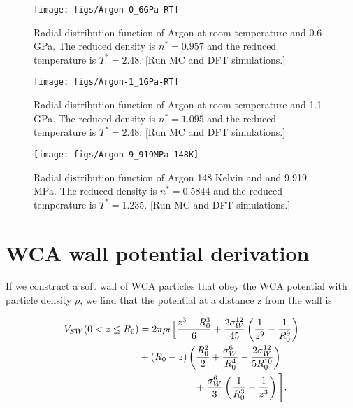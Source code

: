 \documentclass[letterpaper,twocolumn,amsmath,amssymb,prb]{revtex4-1}
\newcommand{\red}[1]{{\color{red} #1}}
\newcommand{\fixme}[1]{\red{[#1]}}
\begin{document}
\begin{figure}
\begin{center}
\texttt{[image: figs/Argon-0\_6GPa-RT]}
\end{center}
\caption{Radial distribution function of Argon at room temperature and
0.6 GPa.  The reduced density is $n^* = 0.957$ and the reduced
temperature is $T^* = 2.48$. \fixme{Run MC and DFT simulations.}}
\label{fig:argon-0.6GPa}
\end{figure}

\begin{figure}
\begin{center}
\texttt{[image: figs/Argon-1\_1GPa-RT]}
\end{center}
\caption{Radial distribution function of Argon at room temperature and
1.1 GPa.  The reduced density is $n^* = 1.095$ and the reduced
temperature is $T^* = 2.48$. \fixme{Run MC and DFT simulations.}}
\label{fig:argon-1.1GPa}
\end{figure}

\begin{figure}
\begin{center}
\texttt{[image: figs/Argon-9\_919MPa-148K]}
\end{center}
\caption{Radial distribution function of Argon 148 Kelvin and and
9.919 MPa.  The reduced density is $n^* = 0.5844$ and the reduced
temperature is $T^* = 1.235$.\fixme{Run MC and DFT simulations.}}
\label{fig:argon-1.1GPa}
\end{figure}

\section{WCA wall potential derivation}

If we construct a soft wall of WCA particles that obey the WCA potential
with particle density $\rho$, we find that the potential at a distance
z from the wall is

\begin{align}
V_{SW}(0 < z \leq R_0) &= 2\pi\rho\epsilon\Big[ \frac{z^3-R_0^3}{6} +
  \frac{2\sigma_W^{12}}{45} \left(\frac{1}{z^9}-\frac{1}{R_0^9}\right)
  \notag \\
  &+ \left( R_0 - z \right)\left(\frac{R_0^2}{2} +
  \frac{\sigma_W^6}{R_0^4} - \frac{2\sigma_W^{12}}{5R_0^{10}}\right)
  \notag \\
  &\hspace{2cm}+\frac{\sigma_W^6}{3}\left(\frac{1}{R_0^3}-\frac{1}{z^3}
  \right) \Bigg].
\end{align}
\end{document}

